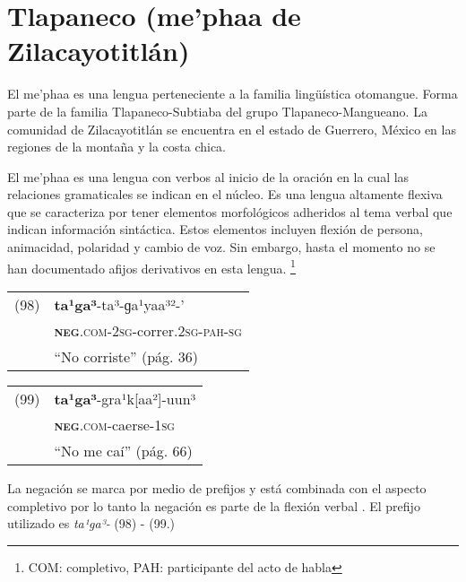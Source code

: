 \section*{Tlapaneco (me’phaa de Zilacayotitlán)}

\noindent El me’phaa es una lengua perteneciente a la familia lingüística otomangue. Forma parte de la familia Tlapaneco-Subtiaba del grupo Tlapaneco-Mangueano. La comunidad de Zilacayotitlán se encuentra en el estado de Guerrero, México en las regiones de la montaña y la costa chica. 

El me'phaa es una lengua con verbos al inicio de la oración en la cual las relaciones gramaticales se indican en el núcleo. Es una lengua altamente flexiva que se caracteriza por tener elementos morfológicos adheridos al tema verbal que indican información sintáctica. Estos elementos incluyen flexión de persona, animacidad, polaridad y cambio de voz. Sin embargo, hasta el momento no se han documentado afijos derivativos en esta lengua.
\footnote{COM: completivo, PAH: participante del acto de habla}
\vspace{0.5cm}

{\setmainfont{Charis SIL} 

\begin{tabular}{ll}
(98) & \textbf{ta¹ga³}-ta³-ɡa¹yaa³²-’\\
& \textsc{\textbf{neg}.com-2sg}-correr.\textsc{2sg-pah-sg}\\
& ``No corriste'' (pág. 36)
\end{tabular} \vspace{0.5cm}

\begin{tabular}{ll}
(99) & \textbf{ta¹ga³}-gra¹k[aa²]-uun³ \\
& \textsc{\textbf{neg}.com}-caerse-\textsc{1sg} \\
& ``No me caí'' (pág. 66)
\end{tabular} \vspace{0.5cm}

}

La negación se marca por medio de prefijos y está combinada con el aspecto completivo por lo tanto la negación es parte de la flexión verbal \textcolor{MidnightBlue}{\citep{Tlapaneco}}. El prefijo utilizado es {\setmainfont{Charis SIL} \textit{ta¹ga³-}} (98) - (99.)